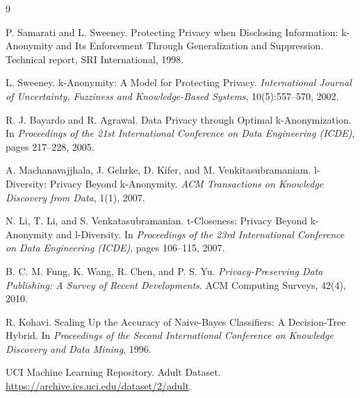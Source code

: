 \documentclass[11pt]{article}
\begin{document}
\begin{thebibliography}{9}

P. Samarati and L. Sweeney.
\newblock Protecting Privacy when Disclosing Information: k-Anonymity and Its Enforcement Through Generalization and Suppression.
\newblock Technical report, SRI International, 1998.

L. Sweeney.
\newblock k-Anonymity: A Model for Protecting Privacy.
\newblock \textit{International Journal of Uncertainty, Fuzziness and Knowledge-Based Systems}, 10(5):557--570, 2002.

R. J. Bayardo and R. Agrawal.
\newblock Data Privacy through Optimal k-Anonymization.
\newblock In \textit{Proceedings of the 21st International Conference on Data Engineering (ICDE)}, pages 217--228, 2005.

A. Machanavajjhala, J. Gehrke, D. Kifer, and M. Venkitasubramaniam.
\newblock l-Diversity: Privacy Beyond k-Anonymity.
\newblock \textit{ACM Transactions on Knowledge Discovery from Data}, 1(1), 2007.

N. Li, T. Li, and S. Venkatasubramanian.
\newblock t-Closeness: Privacy Beyond k-Anonymity and l-Diversity.
\newblock In \textit{Proceedings of the 23rd International Conference on Data Engineering (ICDE)}, pages 106--115, 2007.

B. C. M. Fung, K. Wang, R. Chen, and P. S. Yu.
\newblock \textit{Privacy-Preserving Data Publishing: A Survey of Recent Developments}.
\newblock ACM Computing Surveys, 42(4), 2010.

R. Kohavi.
\newblock Scaling Up the Accuracy of Naive-Bayes Classifiers: A Decision-Tree Hybrid.
\newblock In \textit{Proceedings of the Second International Conference on Knowledge Discovery and Data Mining}, 1996.

UCI Machine Learning Repository.
\newblock Adult Dataset.
\newblock \url{https://archive.ics.uci.edu/dataset/2/adult}.

\end{thebibliography}
\end{document}
